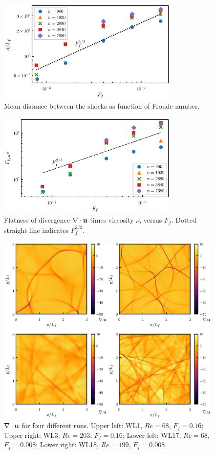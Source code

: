 \begin{figure}
\centerline{\includegraphics[width=9cm]{paper_04_shallow_water/Pyfig/fig13}}
\caption{Mean distance between the shocks as function of Froude number.  }
\label{fig_distance_lap}
\end{figure}


\begin{figure}
\centerline{\includegraphics[width=9cm]{paper_04_shallow_water/Pyfig/fig14}}
\caption{Flatness of divergence $ \nabla \cdot {\bf u} $ times viscosity $ \nu $, versus $ F_f $. Dotted straight line indicates $ F_f^{2/3} $. }
\label{FlatnessDiv}
\end{figure}

\begin{figure}
\centerline{\includegraphics[]{paper_04_shallow_water/Pyfig/fig15}}
\caption{$ \nabla \cdot {\bf u} $ for four different runs. Upper left: WL1, $ Re = 68 $, $ F_f = 0.16 $; Upper right:  { WL3,  $ Re = 203 $, $ F_f = 0.16 $;} Lower left: WL17, $ Re = 68 $, $ F_f = 0.008 $; Lower right: WL18,  $ Re = 199 $, $ F_f = 0.008 $.}
\label{Physical_lap}
\end{figure}




